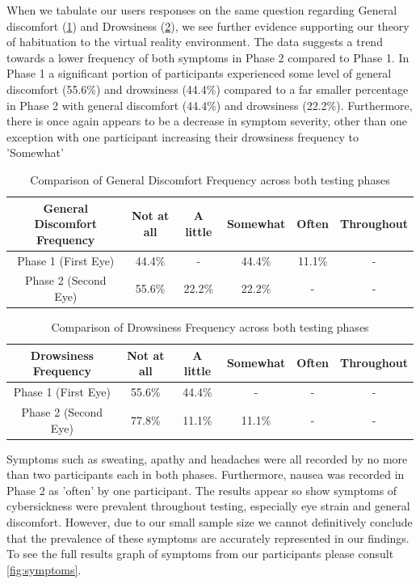 \documentclass{l4proj}
\begin{document}
When we tabulate our users responses on the same question regarding General discomfort (\ref{table:general_discomfort}) and Drowsiness (\ref{table:drowsiness}), we see further evidence supporting our theory of habituation to the virtual reality environment. The data suggests a trend towards a lower frequency of both symptoms in Phase 2 compared to Phase 1. 
In Phase 1 a significant portion of participants experienced some level of general discomfort (55.6\%) and drowsiness (44.4\%) compared to a far smaller percentage in Phase 2 with general discomfort (44.4\%) and drowsiness (22.2\%). Furthermore, there is once again appears to be a decrease in symptom severity, other than one exception with one participant increasing their drowsiness frequency to 'Somewhat'
\begin{table}[h]
    \centering
    \caption{Comparison of General Discomfort Frequency across both testing phases}
    \label{table:general_discomfort}
    \begin{tabular}{|c|c|c|c|c|c|}
        \hline
        \textbf{General Discomfort Frequency} & Not at all & A little & Somewhat & Often & Throughout \\
        \hline
        Phase 1 (First Eye) & 44.4\%  & - & 44.4\% & 11.1\% & - \\
        \hline
        Phase 2 (Second Eye) & 55.6\% & 22.2\% & 22.2\% & - & - \\
        \hline
    \end{tabular}
\end{table}

\begin{table}[h]
    \centering
    \caption{Comparison of Drowsiness Frequency across both testing phases}
    \label{table:drowsiness}
    \begin{tabular}{|c|c|c|c|c|c|}
        \hline
        \textbf{Drowsiness Frequency} & Not at all & A little & Somewhat & Often & Throughout \\
        \hline
        Phase 1 (First Eye) & 55.6\%  & 44.4\% & - & - & -\\
        \hline
        Phase 2 (Second Eye) & 77.8\% & 11.1\% & 11.1\% & - & -\\
        \hline
    \end{tabular}
\end{table}

Symptoms such as sweating, apathy and  headaches were all recorded by no more than two participants each in both phases. Furthermore, nausea was recorded in Phase 2 as 'often' by one participant. The results appear so show symptoms of cybersickness were prevalent throughout testing, especially eye strain and general discomfort. However, due to our small sample size we cannot definitively conclude that the prevalence of these symptoms are accurately represented in our findings. To see the full results graph of symptoms from our participants please consult \ref{fig:symptoms}.
\newpage
\end{document}

